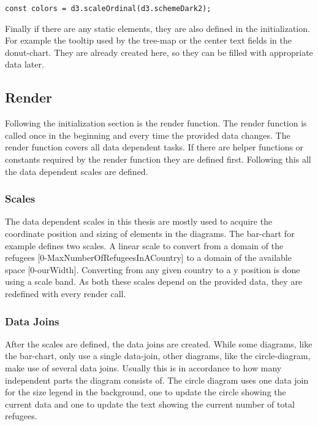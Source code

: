 \begin{minipage}{\linewidth}
\begin{lstlisting}[style=htmlcssjs, caption={Definition of data independent color scale}, label={color_scale}]
const colors = d3.scaleOrdinal(d3.schemeDark2);
\end{lstlisting}
\end{minipage}

Finally if there are any static elements, they are also defined in the initialization. For example the tooltip used by the tree-map or the center text fields in the donut-chart. They are already created here, so they can be filled with appropriate data later.

\subsection{Render}
Following the initialization section is the render function. The render function is called once in the beginning and every time the provided data changes. The render function covers all data dependent tasks. If there are helper functions or constants required by the render function they are defined first. Following this all the data dependent scales are defined.

\subsubsection{Scales}
The data dependent scales in this thesis are mostly used to acquire the coordinate position and sizing of elements in the diagrams. The bar-chart for example defines two scales. A linear scale to convert from a domain of the refugees [0-MaxNumberOfRefugeesInACountry] to a domain of the available space [0-ourWidth]. Converting from any given country to a y position is done using a scale band. As both these scales depend on the provided data, they are redefined with every render call.

\subsubsection{Data Joins}
After the scales are defined, the data joins are created. While some diagrams, like the bar-chart, only use a single data-join, other diagrams, like the circle-diagram, make use of several data joins. Usually this is in accordance to how many independent parts the diagram consists of. The circle diagram uses one data join for the size legend in the background, one to update the circle showing the current data and one to update the text showing the current number of total refugees.


